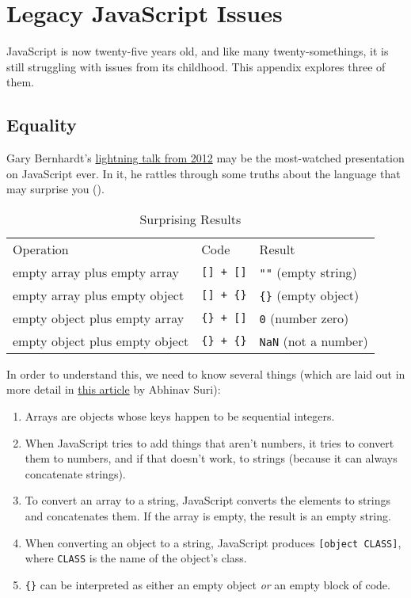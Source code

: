 \chapter{Legacy JavaScript Issues}\label{s:legacy}

JavaScript is now twenty-five years old,
and like many twenty-somethings,
it is still struggling with issues from its childhood.
This appendix explores three of them.

\section{Equality}\label{s:legacy-equality}

Gary Bernhardt's \href{https://www.destroyallsoftware.com/talks/wat}{lightning talk from 2012}
may be the most-watched presentation on JavaScript ever.
In it,
he rattles through some truths about the language that may surprise you
().

\begin{table}
\begin{longtable}{lll}
Operation & Code & Result \\
empty array plus empty array & \texttt{[]\ +\ []} & \texttt{""} (empty string) \\
empty array plus empty object & \texttt{[]\ +\ \{\}} & \texttt{\{\}} (empty object) \\
empty object plus empty array & \texttt{\{\}\ +\ []} & \texttt{0} (number zero) \\
empty object plus empty object & \texttt{\{\}\ +\ \{\}} & \texttt{NaN} (not a number) \\
\end{longtable}
\caption{Surprising Results}
\label{t:legacy-surprises}
\end{table}

In order to understand this, we need to know several things
(which are laid out in more detail in \href{https://medium.com/dailyjs/the-why-behind-the-wat-an-explanation-of-javascripts-weird-type-system-83b92879a8db}{this article} by Abhinav Suri):

\begin{enumerate}
\item
  Arrays are objects whose keys happen to be sequential integers.
\item
  When JavaScript tries to add things that aren't numbers,
  it tries to convert them to numbers,
  and if that doesn't work,
  to strings (because it can always concatenate strings).
\item
  To convert an array to a string,
  JavaScript converts the elements to strings and concatenates them.
  If the array is empty, the result is an empty string.
\item
  When converting an object to a string,
  JavaScript produces \texttt{[object\ CLASS]},
  where \texttt{CLASS} is the name of the object's class.
\item
  \texttt{\{\}} can be interpreted as either an empty object \emph{or} an empty block of code.
\end{enumerate}

